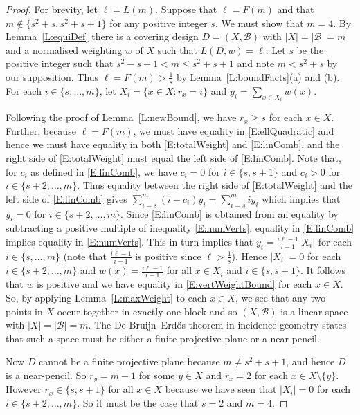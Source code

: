 \documentclass[11pt]{article}
\theoremstyle{definition}
\renewcommand{\leq}{\leqslant}
\renewcommand{\geq}{\geqslant}
\newcommand{\B}{{\ensuremath{\mathcal{B}}}}
\begin{document}
\begin{proof}
For brevity, let $\ell=L(m)$. Suppose that $\ell=F(m)$ and that $m \notin \{s^2+s,s^2+s+1\}$ for any positive integer $s$. We must show that $m=4$. By Lemma~\ref{L:equiDef} there is a covering design $D=(X,\B)$ with $|X|=|\B|=m$ and a normalised weighting $w$ of $X$ such that $L(D,w)=\ell$. Let $s$ be the positive integer such that $s^2-s+1 < m \leq s^2+s+1$ and note $m < s^2+s$ by our supposition. Thus $\ell = F(m) > \frac{1}{s}$ by Lemma~\ref{L:boundFacts}(a) and (b). For each $i \in \{s,\ldots,m\}$, let $X_i=\{x \in X:r_x=i\}$ and $y_i=\sum_{x \in X_i}w(x)$.

Following the proof of Lemma~\ref{L:newBound}, we have $r_x \geq s$ for each $x \in X$. Further, because $\ell=F(m)$, we must have equality in \eqref{E:ellQuadratic} and hence we must have equality in both \eqref{E:totalWeight} and \eqref{E:linComb}, and the right side of \eqref{E:totalWeight} must equal the left side of \eqref{E:linComb}. Note that, for $c_i$ as defined in \eqref{E:linComb}, we have $c_i = 0$ for $i \in \{s,s+1\}$ and $c_i>0$ for $i \in \{s+2,\ldots,m\}$. Thus equality between the right side of \eqref{E:totalWeight} and the left side of \eqref{E:linComb} gives $\sum_{i=s}^m (i-c_i)y_i=\sum_{i=s}^m iy_i$ which implies that $y_i=0$ for $i \in \{s+2,\ldots,m\}$. Since \eqref{E:linComb} is obtained from an equality by subtracting a positive multiple of inequality \eqref{E:numVerts}, equality in \eqref{E:linComb} implies equality in \eqref{E:numVerts}. This in turn implies that $y_i=\frac{i\ell-1}{i-1}|X_i|$ for each $i \in \{s,\ldots,m\}$ (note that $\frac{i\ell-1}{i-1}$ is positive since $\ell > \frac{1}{s}$). Hence $|X_i|=0$ for each $i \in \{s+2,\ldots,m\}$ and $w(x)=\frac{i\ell-1}{i-1}$ for all $x \in X_i$ and $i \in \{s,s+1\}$. It follows that $w$ is positive and we have equality in \eqref{E:vertWeightBound} for each $x \in X$. So, by applying Lemma~\ref{L:maxWeight} to each $x \in X$, we see that any two points in $X$ occur together in exactly one block and so $(X,\B)$ is a linear space with $|X|=|\B|=m$. The De Bruijn–Erd\H{o}s theorem in incidence geometry \cite{DebErd} states that such a space must be either a finite projective plane or a near pencil.

Now $D$ cannot be a finite projective plane because $m \neq s^2+s+1$, and hence $D$ is a near-pencil. So $r_y=m-1$ for some $y \in X$ and $r_x=2$ for each $x \in X \setminus \{y\}$. However $r_x \in \{s,s+1\}$ for all $x \in X$ because we have seen that $|X_i|=0$ for each $i \in \{s+2,\ldots,m\}$. So it must be the case that $s=2$ and $m=4$.
\end{proof}
\end{document}
